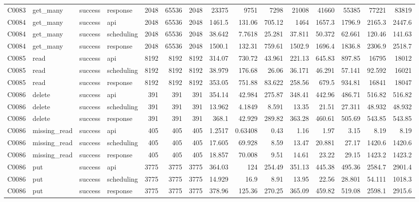 \begin{landscape}
\begin{longtable}{llllrrrrrrrrrrr}
C0083 & get\_\allowbreak{}many & success & response & 2048 & 65536 & 2048 & 23375 & 9751 & 7298 & 21008 & 41660 & 55385 & 77221 & 83819\\
C0084 & get\_\allowbreak{}many & success & api & 2048 & 65536 & 2048 & 1461.5 & 131.06 & 705.12 & 1464 & 1657.3 & 1796.9 & 2165.3 & 2447.6\\
C0084 & get\_\allowbreak{}many & success & scheduling & 2048 & 65536 & 2048 & 38.642 & 7.7618 & 25.281 & 37.811 & 50.372 & 62.661 & 120.46 & 141.63\\
C0084 & get\_\allowbreak{}many & success & response & 2048 & 65536 & 2048 & 1500.1 & 132.31 & 759.61 & 1502.9 & 1696.4 & 1836.8 & 2306.9 & 2518.7\\
C0085 & read & success & api & 8192 & 8192 & 8192 & 314.07 & 730.72 & 43.961 & 221.13 & 645.83 & 897.85 & 16795 & 18012\\
C0085 & read & success & scheduling & 8192 & 8192 & 8192 & 38.979 & 176.68 & 26.06 & 36.171 & 46.291 & 57.141 & 92.592 & 16021\\
C0085 & read & success & response & 8192 & 8192 & 8192 & 353.05 & 751.88 & 83.622 & 258.56 & 679.5 & 934.81 & 16841 & 18047\\
C0086 & delete & success & api & 391 & 391 & 391 & 354.14 & 42.984 & 275.87 & 348.41 & 442.96 & 486.71 & 516.82 & 516.82\\
C0086 & delete & success & scheduling & 391 & 391 & 391 & 13.962 & 4.1849 & 8.591 & 13.35 & 21.51 & 27.311 & 48.932 & 48.932\\
C0086 & delete & success & response & 391 & 391 & 391 & 368.1 & 42.929 & 289.82 & 363.28 & 460.61 & 505.69 & 543.85 & 543.85\\
C0086 & missing\_\allowbreak{}read & success & api & 405 & 405 & 405 & 1.2517 & 0.63408 & 0.43 & 1.16 & 1.97 & 3.15 & 8.19 & 8.19\\
C0086 & missing\_\allowbreak{}read & success & scheduling & 405 & 405 & 405 & 17.605 & 69.928 & 8.59 & 13.47 & 20.881 & 27.17 & 1420.6 & 1420.6\\
C0086 & missing\_\allowbreak{}read & success & response & 405 & 405 & 405 & 18.857 & 70.008 & 9.51 & 14.61 & 23.22 & 29.15 & 1423.2 & 1423.2\\
C0086 & put & success & api & 3775 & 3775 & 3775 & 364.03 & 124 & 254.49 & 351.13 & 445.38 & 495.36 & 2584.7 & 2901.4\\
C0086 & put & success & scheduling & 3775 & 3775 & 3775 & 14.929 & 16.9 & 8.91 & 13.95 & 22.56 & 28.801 & 54.111 & 1018.3\\
C0086 & put & success & response & 3775 & 3775 & 3775 & 378.96 & 125.36 & 270.25 & 365.09 & 459.82 & 519.08 & 2598.1 & 2915.6\\

\end{longtable}
\end{landscape}
